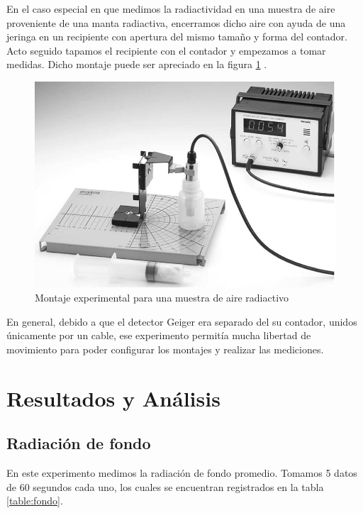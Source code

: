 \documentclass[%
 reprint,
 amsmath,amssymb,
 aps,
]{revtex4-1}
\begin{document}
En el caso especial en que medimos la radiactividad en una muestra de aire proveniente de una manta radiactiva, encerramos dicho aire con ayuda de una jeringa en un recipiente con apertura del mismo tamaño y forma del contador. Acto seguido tapamos el recipiente con el contador y empezamos a tomar medidas. Dicho montaje puede ser apreciado en la figura \ref{fig:airemontaje} .\\


\begin{figure}[h!]
\centering
\includegraphics[width=1\linewidth]{aire.jpg}
\caption{Montaje experimental para una muestra de aire radiactivo}
\label{fig:airemontaje}
\end{figure}

En general, debido a que el detector Geiger era separado del su contador, unidos únicamente por un cable, ese experimento permitía mucha libertad de movimiento para poder configurar los montajes y realizar las mediciones.\\

\section{\label{sec:level1}Resultados y An\'alisis}

\subsection{\label{sec:level2}Radiación de fondo}
En este experimento medimos la radiación de fondo promedio. Tomamos 5 datos de 60 segundos cada uno, los cuales se encuentran registrados en la tabla \ref{table:fondo}.\\
\end{document}

